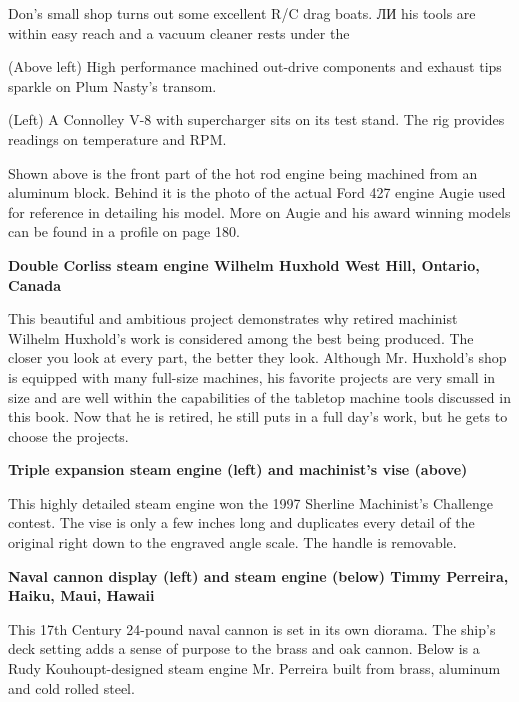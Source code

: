 Don's small shop turns out some excellent R/C drag boats. ЛИ his tools are
within easy reach and a vacuum cleaner rests under the 

(Above left) High performance machined out-drive components and exhaust tips
sparkle on Plum Nasty's transom.

(Left) A Connolley V-8 with supercharger sits on its test stand. The rig
provides readings on temperature and RPM.

Shown above is the front part of the hot rod engine being machined from an
aluminum block. Behind it is the photo of the actual Ford 427 engine Augie used
for reference in detailing his model. More on Augie and his award winning models
can be found in a profile on page 180.

\bigskip
\textbf{Double Corliss steam engine
Wilhelm Huxhold
West Hill, Ontario, Canada}

This beautiful and ambitious project demonstrates why retired machinist Wilhelm
Huxhold's work is considered among the best being produced. The closer you look
at every part, the better they look. Although Mr. Huxhold's shop is equipped
with many full-size machines, his favorite projects are very small in size and
are well within the capabilities of the tabletop machine tools discussed in this
book. Now that he is retired, he still puts in a full day's work, but he gets to
choose the projects.

\bigskip
\textbf{Triple expansion steam engine (left) and machinist's vise (above)}

This highly detailed steam engine won the 1997 Sherline Machinist's Challenge
contest. The vise is only a few inches long and duplicates every detail of the
original right down to the engraved angle scale. The handle is removable.

\bigskip
\textbf{Naval cannon display (left) and steam engine (below) Timmy Perreira,
Haiku, Maui, Hawaii}

This 17th Century 24-pound naval cannon is set in its own diorama. The ship's
deck setting adds a sense of purpose to the brass and oak cannon. Below is a
Rudy Kouhoupt-designed steam engine Mr. Perreira built from brass, aluminum and
cold rolled steel.
